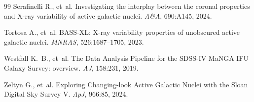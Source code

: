 \documentclass[11pt]{article}
\begin{document}
\begin{thebibliography}{99}
Serafinelli R., et~al.
\newblock Investigating the interplay between the coronal properties and X-ray variability of active galactic nuclei.
\newblock \emph{A\&A}, 690:A145, 2024.

Tortosa A., et~al.
\newblock BASS-XL: X-ray variability properties of unobscured active galactic nuclei.
\newblock \emph{MNRAS}, 526:1687--1705, 2023.

Westfall K.~B., et~al.
\newblock The Data Analysis Pipeline for the SDSS-IV MaNGA IFU Galaxy Survey: overview.
\newblock \emph{AJ}, 158:231, 2019.

Zeltyn G., et~al.
\newblock Exploring Changing-look Active Galactic Nuclei with the Sloan Digital Sky Survey V.
\newblock \emph{ApJ}, 966:85, 2024.

\end{thebibliography}
\end{document}
